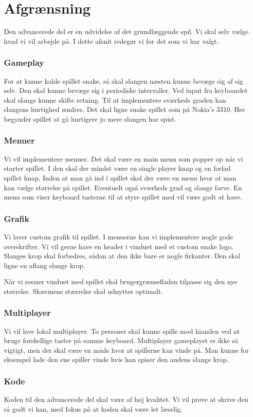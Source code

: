 \section{Afgrænsning}
Den advancerede del er en udvidelse af det grundlæggende spil. Vi skal selv vælge hvad vi vil arbejde på. I dette afsnit redegør vi for det som vi har valgt. 

\subsubsection*{Gameplay}
For at kunne kalde spillet snake, så skal slangen næsten kunne bevæge sig af sig selv. Den skal kunne bevæge sig i periodiske intervaller. Ved input fra keyboardet skal slange kunne skifte retning. Til at implementere sværheds graden kan slangens hurtighed ændres.  Det skal ligne snake spillet som på Nokia's 3310. Her begynder spillet at gå hurtigere jo mere slangen har spist.

\subsubsection*{Menuer}
Vi vil implementere menuer. Det skal være en main menu som popper op når vi starter spillet. I den skal der mindst være  en single player knap og en forlad spillet knap. Inden at man gå ind i spillet skal der være en menu hvor at man kan vælge størrelse på spillet. Eventuelt også sværheds grad og slange farve. En menu som viser keyboard tasterne til at styre spillet med vil være godt at have.

\subsubsection*{Grafik}
Vi laver custom grafik til spillet. I menuerne kan vi implementere nogle gode overskrifter. Vi vil gerne have en header i vinduet med et custom snake logo. Slanges krop skal forbedres, sådan at den ikke bare er nogle firkanter.  Den skal ligne en aflang slange krop. 

Når vi resizer vinduet med spillet skal brugergrænsefladen tilpasse sig den nye størrelse. Skærmens stærrelse skal udnyttes optimalt.

\subsubsection*{Multiplayer}
Vi vil lave lokal multiplayer. To personer skal kunne spille mod hianden ved at bruge forskellige taster på samme keyboard.  Multiplayer gameplayet er ikke så vigtigt, men der skal være en måde hvor at spillerne kan vinde på. Man kunne for eksempel lade den ene spiller vinde hvis han spiser den andens slange krop.

\subsubsection*{Kode}
Koden til den advancerede del skal være af høj kvalitet. Vi vil prøve at skrive den så godt vi kan, med fokus på at koden skal være let læselig.
